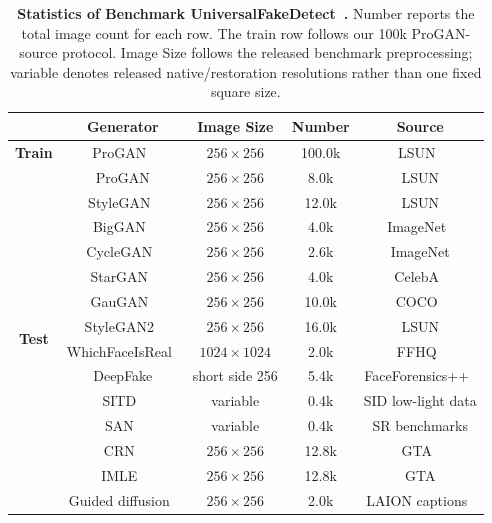 \documentclass[lettersize,journal]{IEEEtran}
\begin{document}
\begin{table}[!htb]
\caption{\textbf{Statistics of Benchmark UniversalFakeDetect~\cite{ojha2023univfd,wang2020cnnspot}.} Number reports the total image count for each row. The train row follows our 100k ProGAN-source protocol. Image Size follows the released benchmark preprocessing; variable denotes released native/restoration resolutions rather than one fixed square size.}
\label{tab:appendix_ufd_statistics}
\centering
\small
\renewcommand{\arraystretch}{1.02}
\setlength{\tabcolsep}{7pt}
\begin{tabular}{@{}c|cccc@{}}
\toprule
& \textbf{Generator} & \textbf{Image Size} & \textbf{Number} & \textbf{Source} \\
\midrule
\textbf{Train} & ProGAN~\cite{karras2018progan} & $256\times256$ & 100.0k & LSUN~\cite{yu2015lsun} \\
\midrule
\multirow{21}{*}{\textbf{Test}}
& ProGAN & $256\times256$ & 8.0k & LSUN \\
& StyleGAN~\cite{karras2019stylegan} & $256\times256$ & 12.0k & LSUN \\
& BigGAN~\cite{brock2019biggan} & $256\times256$ & 4.0k & ImageNet~\cite{deng2009imagenet} \\
& CycleGAN~\cite{zhu2017cyclegan} & $256\times256$ & 2.6k & ImageNet \\
& StarGAN~\cite{choi2018stargan} & $256\times256$ & 4.0k & CelebA~\cite{liu2015celeba} \\
& GauGAN~\cite{park2019spade} & $256\times256$ & 10.0k & COCO~\cite{lin2014coco} \\
& StyleGAN2~\cite{karras2020stylegan2} & $256\times256$ & 16.0k & LSUN \\
& WhichFaceIsReal~\cite{whichfaceisreal2023} & $1024\times1024$ & 2.0k & FFHQ~\cite{karras2019stylegan} \\
& DeepFake & short side 256 & 5.4k & FaceForensics++~\cite{rossler2019faceforensics} \\
& SITD~\cite{chen2018sid} & variable & 0.4k & SID low-light data \\
& SAN~\cite{dai2019san} & variable & 0.4k & SR benchmarks \\
& CRN~\cite{chen2017crn} & $256\times256$ & 12.8k & GTA~\cite{richter2016playing} \\
& IMLE~\cite{li2019imle} & $256\times256$ & 12.8k & GTA \\
& Guided diffusion~\cite{dhariwal2021diffusion} & $256\times256$ & 2.0k & LAION captions~\cite{schuhmann2021laion400m} \\

\end{tabular}
\end{table}
\end{document}
